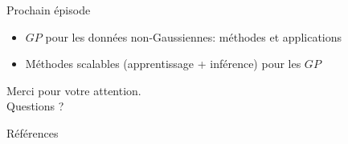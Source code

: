 \documentclass[xcolor=svgnames, t]{beamer}
\begin{document}
\begin{frame}{Prochain épisode}
  \begin{itemize}
    \item $GP$ pour les données non-Gaussiennes: méthodes et applications
    \item Méthodes scalables (apprentissage + inférence) pour les $GP$
  \end{itemize}
\end{frame}

\begin{frame}
  \begin{center}
    Merci pour votre attention.
    \\
    Questions ?
  \end{center}

\end{frame}

\begin{frame}[allowframebreaks]{Références}
  \printbibliography
\end{frame}
\end{document}
